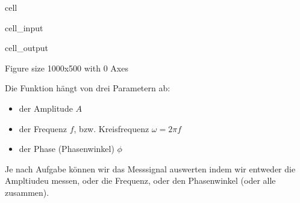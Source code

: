 \documentclass[letterpaper,10pt,english]{jupyterBook}
\begin{document}
\begin{sphinxuseclass}{cell}
\begin{sphinxVerbatimInput}
\begin{sphinxuseclass}{cell_input}
\begin{sphinxVerbatim}[commandchars=\\\{\}]
  
\end{sphinxVerbatim}

\end{sphinxuseclass}\end{sphinxVerbatimInput}
\begin{sphinxVerbatimOutput}

\begin{sphinxuseclass}{cell_output}
\begin{sphinxVerbatim}[commandchars=\\\{\}]
\PYGZlt{}Figure size 1000x500 with 0 Axes\PYGZgt{}
\end{sphinxVerbatim}

\noindent{}

\end{sphinxuseclass}\end{sphinxVerbatimOutput}

\end{sphinxuseclass}
\sphinxAtStartPar
Die Funktion hängt von drei Parametern ab:
\begin{itemize}
\item {} 
\sphinxAtStartPar
der Amplitude \(A\)

\item {} 
\sphinxAtStartPar
der Frequenz \(f\), bzw. Kreisfrequenz \(\omega = 2\pi f\)

\item {} 
\sphinxAtStartPar
der Phase (Phasenwinkel) \(\phi\)

\end{itemize}

\sphinxAtStartPar
Je nach Aufgabe können wir das Messsignal auswerten indem wir entweder die Ampltiudeu messen, oder die Frequenz, oder den Phasenwinkel (oder alle zusammen).
\end{document}
